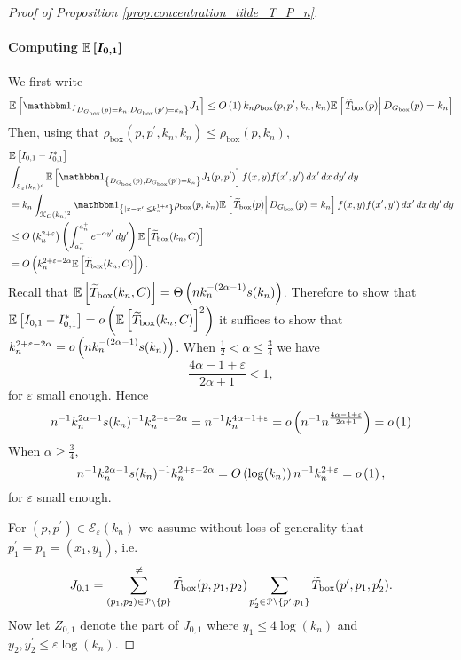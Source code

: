 \begin{proof}[Proof of Proposition \ref{prop:concentration_tilde_T_P_n}]
\paragraph{Computing $\bm{\mathbb{E}\left[I_{0,1}\right]}$}

We first write
\begin{equation}\label{eq:bound_E_J1}
	\Exp{\ind{\Dbox(p) = k_n, \Dbox(p^\prime) = k_n} J_1}
	\le \bigO{1} k_n \rho_{\text{box}}(p,p^\prime,k_n,k_n)\CExp{\widetilde{T}_{\text{box}}(p)}{\Dbox(p) = k_n}
\end{equation}
Then, using that $\rho_{\text{box}}(p,p^\prime,k_n,k_n) \le \rho_{\text{box}}(p,k_n)$,
\begin{align*}
	&\Exp{I_{0,1} - I_{0,1}^\ast}\\
	&\int_{\mathcal{E}_\varepsilon(k_n)^c}
		\Exp{\ind{\Dbox(p), \Dbox(p^\prime) = k_n} J_1(p,p^\prime)} f(x,y) f(x^\prime,y^\prime) \, dx^\prime \, dx \, dy^\prime \, dy\\
	&= k_n \int_{\Kcal_C(k_n)^2} \ind{|x-x^\prime| \le k_n^{1 + \varepsilon}}
		\rho_{\text{box}}(p,k_n)\CExp{\widetilde{T}_{\text{box}}(p)}{\Dbox(p) = k_n} f(x,y) f(x^\prime,y^\prime) \, dx^\prime \, dx \, dy^\prime \, dy\\
	&\le \bigO{k_n^{2+\varepsilon}} \left(\int_{a_n^-}^{a_n^+} e^{-\alpha y^\prime} \, dy^\prime\right) 
		\Exp{\widetilde{T}_{\text{box}}(k_n,C)}\\
	&= \bigO{k_n^{2 + \varepsilon - 2\alpha} \Exp{\widetilde{T}_{\text{box}}(k_n,C)}}.
\end{align*}
Recall that $\mathbb{E}\left[\widetilde{T}_{\text{box}}(k_n,C)\right] = \Theta\left(n k_n^{-(2\alpha - 1)}s(k_n)\right)$. Therefore to show that $\mathbb{E}\left[I_{0,1} - I_{0,1}^\ast\right] = o\left(\mathbb{E}\left[\widetilde{T}_{\text{box}}(k_n,C)\right]^2\right)$ it suffices to show that $k_n^{2 + \varepsilon - 2\alpha} = o\left(n k_n^{-(2\alpha - 1)}s(k_n)\right)$. When $\frac{1}{2} < \alpha \le \frac{3}{4}$ we have
\[
	\frac{4\alpha - 1 + \varepsilon}{2\alpha + 1} < 1,
\]
for $\varepsilon$ small enough. Hence
\[
	n^{-1} k_n^{2\alpha - 1} s(k_n)^{-1} k_n^{2 + \varepsilon -2\alpha} = n^{-1} k_n^{4\alpha - 1 + \varepsilon} 
	= o\left(n^{-1}n^{\frac{4\alpha - 1 + \varepsilon}{2\alpha + 1}}\right) = o\left(1\right)
\]
When $\alpha \ge \frac{3}{4}$,
\[
	n^{-1} k_n^{2\alpha - 1} s(k_n)^{-1} k_n^{2 + \varepsilon -2\alpha} = O\left(\log(k_n)\right) n^{-1} k_n^{2 + \varepsilon} = o\left(1\right),
\]
for $\varepsilon$ small enough.

For $(p,p^\prime) \in \mathcal{E}_\varepsilon(k_n)$ we assume without loss of generality that $p_1^\prime = p_1 = (x_1,y_1)$, i.e.
\[
	J_{0,1} = \sum_{(p_1, p_2) \in {\mathcal P} \setminus \{p\}}^{\ne} \widetilde{T}_{\text{box}}(p,p_1,p_2) 
	\sum_{p_2^\prime \in {\mathcal P} \setminus \{p^\prime, p_1\}} \widetilde{T}_{\text{box}}(p^\prime,p_1,p_2^\prime). 
\] 
Now let $Z_{0,1}$ denote the part of $J_{0,1}$ where $y_1 \le 4\log(k_n)$ and $y_2, y_2^\prime \le \varepsilon \log(k_n)$. 


\end{proof}
